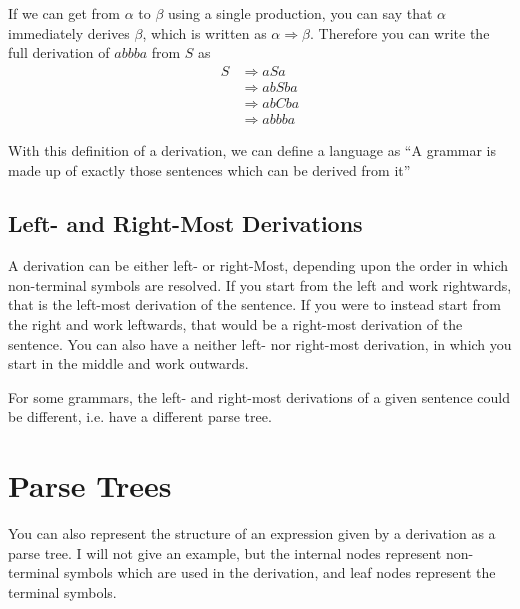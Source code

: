 If we can get from $\alpha$ to $\beta$ using a single production, you can say that $\alpha$ immediately derives $\beta$,
 which is written as $\alpha \Rightarrow \beta$. Therefore you can write the full derivation of $abbba$ from $S$ as
\begin{equation*}
  \begin{split}
    S & \Rightarrow aSa \\
    & \Rightarrow abSba \\
    & \Rightarrow abCba \\
    & \Rightarrow abbba
  \end{split}
\end{equation*}

With this definition of a derivation, we can define a language as ``A grammar is made up of exactly those sentences
 which can be derived from it''

\subsection*{Left- and Right-Most Derivations}

A derivation can be either left- or right-Most, depending upon the order in which non-terminal symbols are resolved. If
 you start from the left and work rightwards, that is the left-most derivation of the sentence. If you were to instead
 start from the right and work leftwards, that would be a right-most derivation of the sentence. You can also have a
 neither left- nor right-most derivation, in which you start in the middle and work outwards.

For some grammars, the left- and right-most derivations of a given sentence could be different, i.e. have a different
 parse tree.

\section*{Parse Trees}

You can also represent the structure of an expression given by a derivation as a parse tree. I will not give an example,
 but the internal nodes represent non-terminal symbols which are used in the derivation, and leaf nodes represent the
 terminal symbols.